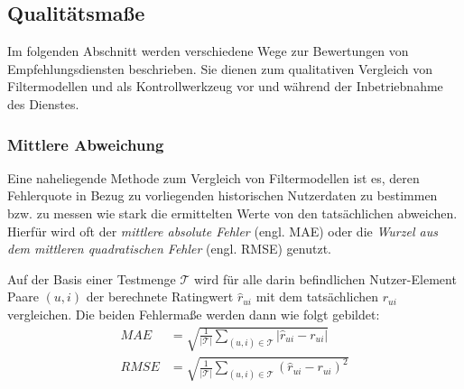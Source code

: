 \subsection{Qualitätsmaße}\label{sec:measures}
%
%

Im folgenden Abschnitt werden verschiedene Wege zur Bewertungen von Empfehlungsdiensten beschrieben. Sie dienen zum qualitativen Vergleich von Filtermodellen und als Kontrollwerkzeug vor und während der Inbetriebnahme des Dienstes.

\subsubsection{Mittlere Abweichung}

Eine naheliegende Methode zum Vergleich von Filtermodellen ist es, deren Fehlerquote in Bezug zu vorliegenden historischen Nutzerdaten zu bestimmen bzw. zu messen wie stark die ermittelten Werte von den tatsächlichen abweichen. Hierfür wird oft der \textit{mittlere absolute Fehler} (engl. \acf{MAE}) oder die \textit{Wurzel aus dem mittleren quadratischen Fehler} (engl. \acf{RMSE}) genutzt.

Auf der Basis einer Testmenge $\mathcal{T}$ wird für alle darin befindlichen Nutzer-Element Paare $(u,i)$ der berechnete Ratingwert $\hat{r}_{ui}$ mit dem tatsächlichen $r_{ui}$ vergleichen. Die beiden Fehlermaße werden dann wie folgt gebildet:
\begin{align}
MAE & = \sqrt{\frac{1}{|\mathcal{T}|} \sum_{(u,i) \in \mathcal{T}}{|\hat{r}_{ui}-r_{ui}|}} \label{form:mae} \\
RMSE & = \sqrt{\frac{1}{|\mathcal{T}|} \sum_{(u,i) \in \mathcal{T}}{(\hat{r}_{ui}-r_{ui})^2}} \label{form:rmse}
\end{align}

